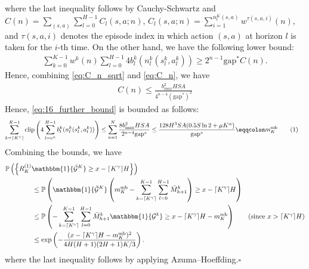 \documentclass[11pt]{article}
\newcommand{\PP}{\mathbb{P}}
\newcommand{\Dvm}{\bar{M}}
\newcommand{\clip}{\mathrm{clip}}
\newcommand\numberthis{\addtocounter{equation}{1}\tag{\theequation}}
\newcommand{\gap}{\mathrm{gap}}
\newcommand{\gapstar}{\mathrm{gap}^*}
\begin{document}
where the last inequality follows by Cauchy-Schwartz and $C(n) = \sum_{(s,a)}\sum_{l=0}^{H-1} C_l{(s,a;n)}$, $C_l{(s,a;n)} = \sum_{i=1}^{n_l^K(s, a)} w^{\tau(s,a,i)}(n)$, and $\tau(s,a,i)$ denotes the episode index in which action $(s,a)$ at horizon $l$ is taken for the $i$-th time. On the other hand, we have the following lower bound:
\begin{align}
    \sum_{k=0}^{K-1} w^k(n)\sum_{l=0}^{H-1}   4 b^k_l(n_l^k(s_l^k, a_l^k)) \geq 2^{n-1}\gapstar C(n).\label{eq:C_n}
\end{align}
Hence, combining \eqref{eq:C_n_sqrt} and \eqref{eq:C_n}, we have 
\begin{align*}
    C(n) \leq  \frac{b^2_{max} H S A}{4^{n-4}(\gapstar)^2}
\end{align*}
Hence, \eqref{eq:16_further_bound} is bounded as follows:
\begin{align*}
     \sum_{k=\lceil K^\gamma\rceil}^{K-1} \clip\left(4 \sum_{l=\upsilon^k}^{H-1}  b^k_l(n_l^k(s_l^k, a_l^k))\right) &\leq \sum_{n=1}^N \frac{8 b^2_{\max} H S A}{ 2^{n-4} \gap^*} \leq \frac{128 H^3 S A (0.5 S \ln 2 + \mu K^\alpha)}{\gapstar}  \eqqcolon m_K^{\mathrm{mb}} \numberthis\label{eq:m_k^mb-ineq}
\end{align*}
Combining the bounds, we have
\begin{align*}
    &\PP\left( \left\{R_K^{(1)} \mathbbm{1}\{\bar{\mathcal{G}}^K\} \geq x-\lceil K^\gamma\rceil H\right\}\right) \\
    &\qquad\qquad\leq\PP\left( \mathbbm{1}\{\bar{\mathcal{G}}^K\}\left(m_K^{\mathrm{mb}} - \sum_{k=\lceil K^\gamma\rceil}^{K-1}\sum_{l=0}^{H-1} \Dvm_{h+1}^k \right) \geq  x-\lceil K^\gamma\rceil H \right)\\
    &\qquad\qquad\leq\PP\left(  - \sum_{k=\lceil K^\gamma\rceil}^{K-1}\sum_{l=0}^{H-1} \Dvm_{h+1}^k \mathbbm{1}\{\mathcal{G}^k\} \geq  x-\lceil K^\gamma\rceil H - m_K^{\mathrm{mb}}\right)\tag{since $x > \lceil K^\gamma\rceil H$}\\
    &\qquad\qquad\leq \exp \left( - \frac{(x-\lceil K^\gamma\rceil H - m_K^{\mathrm{mb}})^2}{4H(H+1)(2H+1)K/3}\right).
\end{align*}
where the last inequality follows by applying Azuma–Hoeffding.\hfill$\square$
\end{document}
